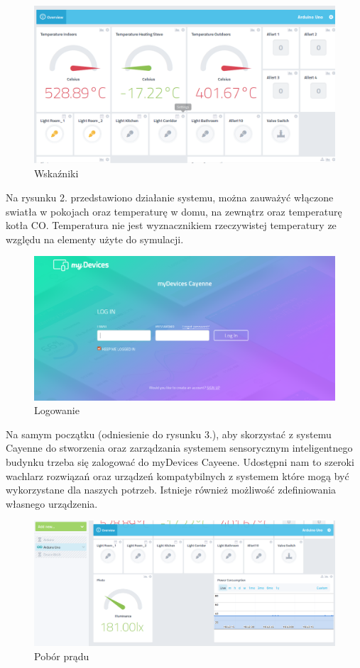 \documentclass[12pt]{article} %
\begin{document}
\begin{figure}[!h]
  \centering
  \includegraphics[width=\columnwidth]{images/1.png}
  \caption{Wskaźniki}
\end{figure}

Na rysunku 2.  przedstawiono działanie systemu, można zauważyć włączone swiatła w pokojach oraz temperaturę w domu, na zewnątrz oraz temperaturę kotła CO. Temperatura nie jest wyznacznikiem rzeczywistej temperatury ze względu na elementy użyte do symulacji.

\begin{figure}[!h]
  \centering
  \includegraphics[width=\columnwidth]{images/2.png}
  \caption{Logowanie}
\end{figure}
Na samym początku (odniesienie do rysunku 3.), aby skorzystać z systemu Cayenne do stworzenia oraz zarządzania systemem sensorycznym inteligentnego budynku trzeba się zalogować do myDevices Cayeene. Udostępni nam to szeroki wachlarz rozwiązań oraz urządzeń kompatybilnych z systemem które mogą być wykorzystane dla naszych potrzeb. Istnieje również możliwość zdefiniowania własnego urządzenia.

\begin{figure}[!h]
  \centering
  \includegraphics[width=\columnwidth]{images/3.png}
  \caption{Pobór prądu}
\end{figure}
\end{document}
